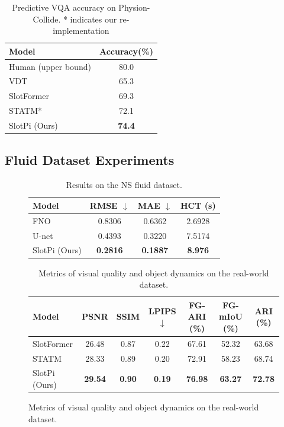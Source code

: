 \documentclass[sigconf]{acmart}
\begin{document}
\begin{table}[t!]
\caption{Predictive VQA accuracy on Physion-Collide. * indicates our re-implementation}
\label{tab4-4}
\vspace{-6pt}
\begin{tabular}{lc}
\toprule
{\bf Model}&\small {\bf Accuracy}(\%)\\
\midrule
Human (upper bound)&80.0\\
VDT&65.3\\
SlotFormer&69.3\\
STATM*&72.1\\
SlotPi (Ours)&\textbf{74.4}\\
\bottomrule
\end{tabular}
\vspace{-6pt}
\end{table}


\subsection{Fluid Dataset Experiments}
\label{exp-42}

\begin{figure}[t!]
\centering
\begin{minipage}{0.36\textwidth}
\begin{table}[H]
\caption{Results on the NS fluid dataset.}
\label{tab4-5}
\vspace{-6pt}
\begin{tabular}{lccc}
\toprule
{\bf Model}&\small {\bf RMSE} $\downarrow$&\small {\bf MAE} $\downarrow$&\small {\bf HCT (s)}\\
\midrule
FNO&0.8306&0.6362&2.6928\\
U-net&0.4393&0.3220&7.5174\\
SlotPi (Ours)&\textbf{0.2816}&\textbf{0.1887}&\textbf{8.976}\\
\bottomrule
\end{tabular}
\end{table}
\end{minipage}%
\hfill
\begin{minipage}{0.62\textwidth}
\begin{table}[H]
\caption{Metrics of visual quality and object dynamics on the real-world dataset.}
\label{tab4-6}
\vspace{-6pt}
\begin{tabular}{lcccccc}
\toprule
{\bf Model}&\small {\bf PSNR}&\small {\bf SSIM}&\small {\bf LPIPS} $\downarrow$&\small {\bf FG-ARI} \textsf{(\%)}&\small {\bf FG-mIoU} \textsf{(\%)}&\small {\bf ARI} \textsf{(\%)}\\
\midrule
SlotFormer&26.48&0.87&0.22&67.61&52.32&63.68\\
STATM&28.33&0.89&0.20&72.91&58.23&68.74\\
SlotPi (Ours)&\textbf{29.54}&\textbf{0.90}&\textbf{0.19}&\textbf{76.98}&\textbf{63.27}&\textbf{72.78}\\
\bottomrule
\end{tabular}
\end{table}
\end{minipage}
\end{figure}
\end{document}

